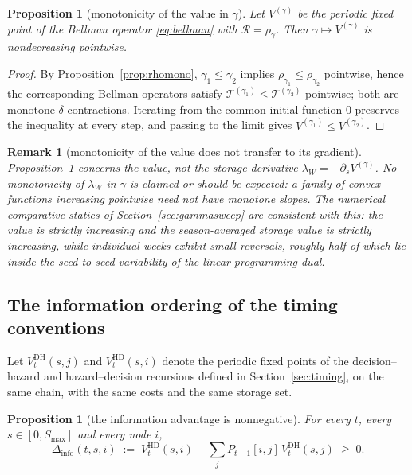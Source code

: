 \documentclass[pdflatex,sn-mathphys-num]{sn-jnl}
\theoremstyle{thmstyleone}
\newtheorem{proposition}[theorem]{Proposition}
\theoremstyle{thmstyletwo}
\newtheorem{remark}[theorem]{Remark}
\theoremstyle{thmstylethree}
\newcommand{\ssv}{\lambda_{W}}
\begin{document}
\begin{appendices}
\begin{proposition}[monotonicity of the value in $\gamma$]
\label{prop:Vmono}
Let $V^{(\gamma)}$ be the periodic fixed point of the Bellman operator
\eqref{eq:bellman} with $\mathcal R=\rho_\gamma$. Then
$\gamma\mapsto V^{(\gamma)}$ is nondecreasing pointwise.
\end{proposition}

\begin{proof}
By Proposition~\ref{prop:rhomono}, $\gamma_1\le\gamma_2$ implies
$\rho_{\gamma_1}\le\rho_{\gamma_2}$ pointwise, hence the corresponding
Bellman operators satisfy $\mathcal T^{(\gamma_1)}\le\mathcal T^{(\gamma_2)}$
pointwise; both are monotone $\delta$-contractions. Iterating from the
common initial function $0$ preserves the inequality at every step, and
passing to the limit gives $V^{(\gamma_1)}\le V^{(\gamma_2)}$.
\end{proof}

\begin{remark}[monotonicity of the value does not transfer to its gradient]
\label{rem:ssvmono}
Proposition~\ref{prop:Vmono} concerns the value, not the storage
derivative $\ssv=-\partial_s V^{(\gamma)}$. No monotonicity of $\ssv$ in
$\gamma$ is claimed or should be expected: a family of convex functions
increasing pointwise need not have monotone slopes. The numerical
comparative statics of Section~\ref{sec:gammasweep} are consistent with
this: the value is strictly increasing and the season-averaged storage
value is strictly increasing, while individual weeks exhibit small
reversals, roughly half of which lie inside the seed-to-seed variability of
the linear-programming dual.
\end{remark}

\subsection{The information ordering of the timing conventions}
\label{app:timing}

Let $V^{\mathrm{DH}}_t(s,j)$ and $V^{\mathrm{HD}}_t(s,i)$ denote the
periodic fixed points of the decision--hazard and hazard--decision
recursions defined in Section~\ref{sec:timing}, on the same chain, with the
same costs and the same storage set.

\begin{proposition}[the information advantage is nonnegative]
\label{prop:info}
For every $t$, every $s\in[0,S_{\max}]$ and every node $i$,
\[
\Delta_{\mathrm{info}}(t,s,i)\;:=\;V^{\mathrm{HD}}_t(s,i)
-\sum_{j}P_{t-1}[i,j]\,V^{\mathrm{DH}}_t(s,j)\;\ge\;0 .
\]
\end{proposition}


\end{appendices}
\end{document}

